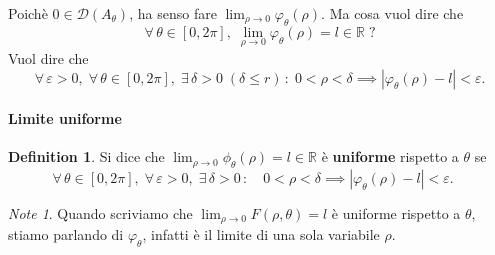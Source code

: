 \documentclass{article}
\theoremstyle{plain}
\theoremstyle{definition}
\newtheorem{defn}{Definition}[section]
\theoremstyle{remark}
\newtheorem{note}{Note}
\begin{document}
% 

\vspace{10pt}

Poichè $0\in\mathcal{D}(A_\theta)$, ha senso fare $\lim_{\rho\to0}\varphi_\theta(\rho)$. 
Ma cosa vuol dire che 
\[\forall\,\theta\in[0,2\pi],\; \lim_{\rho\to0}\varphi_\theta(\rho)=l\in\mathbb{R}\;?\]
Vuol dire che 
\[\forall\,\varepsilon>0,\;\forall\,\theta\in[0,2\pi],\;\exists\,\delta>0\;(\delta\leq r)\,:\; 0<\rho<\delta\implies|\varphi_\theta(\rho)-l|<\varepsilon.\]

\vspace{10pt}

\paragraph{Limite uniforme}
\begin{bxthm}
\begin{defn}
Si dice che $\lim_{\rho\to0}\phi_\theta(\rho)=l\in\mathbb{R}$ è \textbf{uniforme} rispetto a $\theta$ se 
\[\forall\,\theta\in[0,2\pi],\;\forall\,\varepsilon>0,\;\exists\,\delta>0\,:\quad 0<\rho<\delta\implies|\varphi_\theta(\rho)-l|<\varepsilon.\quad\]
\end{defn}
\end{bxthm}

\vspace{10pt}

\begin{note}
Quando scriviamo che $\lim_{\rho\to0}F(\rho,\theta)=l$ è uniforme rispetto a $\theta$, stiamo parlando di $\varphi_\theta$, infatti è il limite di una sola variabile $\rho$.
\end{note}

\vspace{10pt}
\end{document}
